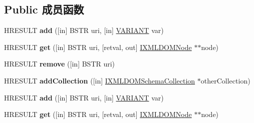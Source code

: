 \subsection*{Public 成员函数}
\begin{DoxyCompactItemize}
\item 
\mbox{\label{interface_m_s_x_m_l2_1_1_i_x_m_l_d_o_m_schema_collection_a41327b70b01781e59955dd455c7f116d}} 
H\+R\+E\+S\+U\+LT {\bfseries add} (\mbox{[}in\mbox{]} B\+S\+TR uri, \mbox{[}in\mbox{]} \hyperlink{structtag_v_a_r_i_a_n_t}{V\+A\+R\+I\+A\+NT} var)
\item 
\mbox{\label{interface_m_s_x_m_l2_1_1_i_x_m_l_d_o_m_schema_collection_a300308db3b2ff99461f1df40d33d34ff}} 
H\+R\+E\+S\+U\+LT {\bfseries get} (\mbox{[}in\mbox{]} B\+S\+TR uri, \mbox{[}retval, out\mbox{]} \hyperlink{interface_m_s_x_m_l2_1_1_i_x_m_l_d_o_m_node}{I\+X\+M\+L\+D\+O\+M\+Node} $\ast$$\ast$node)
\item 
\mbox{\label{interface_m_s_x_m_l2_1_1_i_x_m_l_d_o_m_schema_collection_ad0153d3cf3ccfc3c51c0507f67cb25a3}} 
H\+R\+E\+S\+U\+LT {\bfseries remove} (\mbox{[}in\mbox{]} B\+S\+TR uri)
\item 
\mbox{\label{interface_m_s_x_m_l2_1_1_i_x_m_l_d_o_m_schema_collection_ac1cdb4963709d80d4dea098a8229df0e}} 
H\+R\+E\+S\+U\+LT {\bfseries add\+Collection} (\mbox{[}in\mbox{]} \hyperlink{interface_m_s_x_m_l2_1_1_i_x_m_l_d_o_m_schema_collection}{I\+X\+M\+L\+D\+O\+M\+Schema\+Collection} $\ast$other\+Collection)
\item 
\mbox{\label{interface_m_s_x_m_l2_1_1_i_x_m_l_d_o_m_schema_collection_a41327b70b01781e59955dd455c7f116d}} 
H\+R\+E\+S\+U\+LT {\bfseries add} (\mbox{[}in\mbox{]} B\+S\+TR uri, \mbox{[}in\mbox{]} \hyperlink{structtag_v_a_r_i_a_n_t}{V\+A\+R\+I\+A\+NT} var)
\item 
\mbox{\label{interface_m_s_x_m_l2_1_1_i_x_m_l_d_o_m_schema_collection_a300308db3b2ff99461f1df40d33d34ff}} 
H\+R\+E\+S\+U\+LT {\bfseries get} (\mbox{[}in\mbox{]} B\+S\+TR uri, \mbox{[}retval, out\mbox{]} \hyperlink{interface_m_s_x_m_l2_1_1_i_x_m_l_d_o_m_node}{I\+X\+M\+L\+D\+O\+M\+Node} $\ast$$\ast$node)

\end{DoxyCompactItemize}
